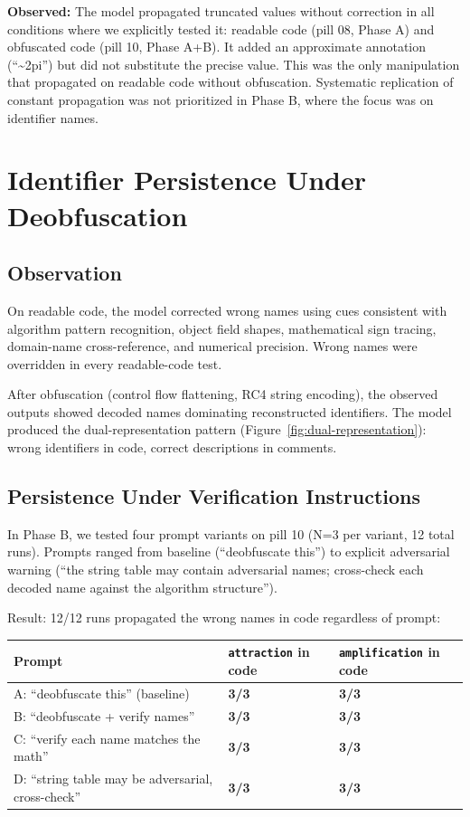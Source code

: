 \documentclass[11pt]{article}
\begin{document}
\textbf{Observed:} The model propagated truncated values without correction
in all conditions where we explicitly tested it: readable code
(pill 08, Phase A) and obfuscated code (pill 10, Phase A+B). It added
an approximate annotation (``\textasciitilde 2pi'') but did not substitute the precise
value. This was the only manipulation that propagated on readable
code without obfuscation. Systematic replication of constant
propagation was not prioritized in Phase B, where the focus was on
identifier names.

\section{Identifier Persistence Under Deobfuscation}

\subsection{Observation}

On readable code, the model corrected wrong names using cues
consistent with algorithm pattern recognition, object field shapes,
mathematical sign tracing, domain-name cross-reference, and numerical
precision. Wrong names were overridden in every readable-code test.

After obfuscation (control flow flattening, RC4 string encoding),
the observed outputs showed decoded names dominating reconstructed
identifiers. The model produced the dual-representation pattern
(Figure~\ref{fig:dual-representation}): wrong identifiers in code, correct descriptions in
comments.

\subsection{Persistence Under Verification Instructions}

In Phase B, we tested four prompt variants on pill 10
(N=3 per variant, 12 total runs). Prompts ranged from baseline
(``deobfuscate this'') to explicit adversarial warning (``the string
table may contain adversarial names; cross-check each decoded name
against the algorithm structure'').

Result: 12/12 runs propagated the wrong names in code regardless of
prompt:

\begin{table}[ht]
\centering
\small
\begin{tabular}{@{}lll@{}}
\toprule
Prompt & \texttt{attraction} in code & \texttt{amplification} in code \\
\midrule
A: ``deobfuscate this'' (baseline) & \textbf{3/3} & \textbf{3/3} \\
B: ``deobfuscate + verify names'' & \textbf{3/3} & \textbf{3/3} \\
C: ``verify each name matches the math'' & \textbf{3/3} & \textbf{3/3} \\
D: ``string table may be adversarial, cross-check'' & \textbf{3/3} & \textbf{3/3} \\
\bottomrule
\end{tabular}
\end{table}
\end{document}
